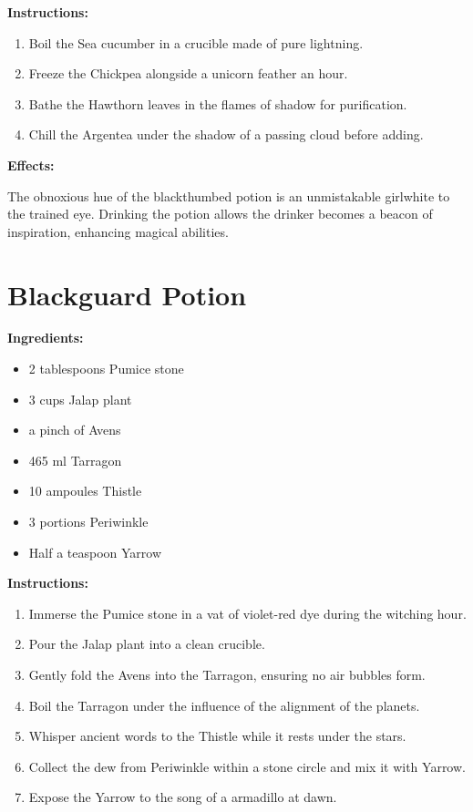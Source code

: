 \documentclass{article}
\begin{document}
\textbf{Instructions:}

\begin{enumerate}
  \item Boil the Sea cucumber in a crucible made of pure lightning.
  \item Freeze the Chickpea alongside a unicorn feather an hour.
  \item Bathe the Hawthorn leaves in the flames of shadow for purification.
  \item Chill the Argentea under the shadow of a passing cloud before adding.
\end{enumerate}

\textbf{Effects:}

The obnoxious hue of the blackthumbed potion is an unmistakable girlwhite to the trained eye. Drinking the potion allows the drinker becomes a beacon of inspiration, enhancing magical abilities.

\newpage
\section*{Blackguard Potion}

\textbf{Ingredients:}

\begin{itemize}
  \item 2 tablespoons Pumice stone
  \item 3 cups Jalap plant
  \item a pinch of Avens
  \item 465 ml Tarragon
  \item 10 ampoules Thistle
  \item 3 portions Periwinkle
  \item Half a teaspoon Yarrow
\end{itemize}

\textbf{Instructions:}

\begin{enumerate}
  \item Immerse the Pumice stone in a vat of violet-red dye during the witching hour.
  \item Pour the Jalap plant into a clean crucible.
  \item Gently fold the Avens into the Tarragon, ensuring no air bubbles form.
  \item Boil the Tarragon under the influence of the alignment of the planets.
  \item Whisper ancient words to the Thistle while it rests under the stars.
  \item Collect the dew from Periwinkle within a stone circle and mix it with Yarrow.
  \item Expose the Yarrow to the song of a armadillo at dawn.
\end{enumerate}
\end{document}
